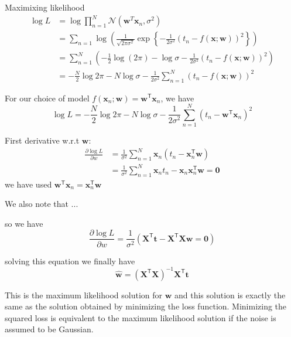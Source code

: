 \documentclass[a4paper,11pt]{article} %
\begin{document}
Maximixing likelihood
\begin{align*}
\log L & = \log \prod_{n=1}^{N} \mathcal{N}(\mathbf{w}^{T}\mathbf{x}_{n},\sigma^2) \\
& = \sum_{n=1} \log \left( \frac{1}{\sqrt{2\pi\sigma^2}}
\exp\left\{ -\frac{1}{2\sigma^2}
\left( t_{n} - f(\mathbf{x};\mathbf{w}) \right)^2
\right\} \right) \\
& = \sum_{n=1}^{N} \left(
-\frac{1}{2}\log(2\pi) - \log\sigma - \frac{1}{2\sigma^2}
\left( t_{n} - f(\mathbf{x};\mathbf{w}) \right)^2 \right) \\
& = -\frac{N}{2}\log 2\pi - N\log\sigma - \frac{1}{2\sigma^2}
\sum_{n=1}^{N} \left( t_{n} - f(\mathbf{x};\mathbf{w}) \right)^2
\end{align*}

For our choice of model
$f(\mathbf{x}_{n}; \mathbf{w}) = \mathbf{w}^{\mathsf{T}}\mathbf{x}_{n}$, we have
\begin{equation}
\log L = -\frac{N}{2} \log 2\pi - N\log\sigma - \frac{1}{2\sigma^2}
\sum_{n=1}^{N} \left( t_{n} - \mathbf{w}^{\mathsf{T}}\mathbf{x}_{n} \right)^2
\end{equation}

First derivative w.r.t $\mathbf{w}$:
\begin{align*}
\frac{\partial\log L}{\partial w} & = \frac{1}{\sigma^2}
\sum_{n=1}^{N} \mathbf{x}_{n} \left( t_{n} - \mathbf{x}^{\mathsf{T}}_{n} \mathbf{w} \right) \\
& = \frac{1}{\sigma^2}\sum_{n=1}^{N} \mathbf{x}_{n} t_{n} - 
\mathbf{x}_{n}\mathbf{x}_{n}^{\mathsf{T}}\mathbf{w}
= \mathbf{0}
\end{align*}
we have used
$\mathbf{w}^{\mathsf{T}}\mathbf{x}_{n} = \mathbf{x}_{n}^{\mathsf{T}}\mathbf{w}$

We also note that ...

so we have
\begin{equation}
\frac{\partial\log L}{\partial w} = \frac{1}{\sigma^2}\left(
\mathbf{X}^{\mathsf{T}}\mathbf{t} - \mathbf{X}^{\mathsf{T}}\mathbf{X}\mathbf{w} = \mathbf{0}
\right)
\end{equation}

solving this equation we finally have
\begin{equation}
\widehat{\mathbf{w}} = \left(\mathbf{X}^{\mathsf{T}}\mathbf{X}\right)^{-1}
\mathbf{X}^{\mathsf{T}}\mathbf{t}
\end{equation}

This is the maximum likelihood solution for $\mathbf{w}$ and this solution is exactly
the same as the solution obtained by minimizing the loss function.
Minimizing the squared loss is equivalent
to the maximum likelihood solution if the noise is assumed to be Gaussian.
\end{document}
